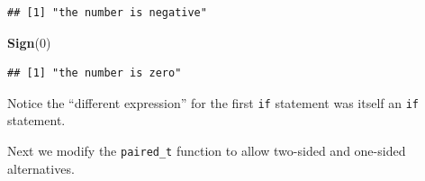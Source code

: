 \documentclass[
]{krantz}
\newenvironment{Shaded}{\begin{snugshade}}{\end{snugshade}}
\newcommand{\DecValTok}[1]{\textcolor[rgb]{0.00,0.00,0.81}{#1}}
\newcommand{\KeywordTok}[1]{\textcolor[rgb]{0.13,0.29,0.53}{\textbf{#1}}}
\newcommand{\NormalTok}[1]{#1}
\begin{document}
\begin{verbatim}
## [1] "the number is negative"
\end{verbatim}

\begin{Shaded}
\begin{Highlighting}[]
\KeywordTok{Sign}\NormalTok{(}\DecValTok{0}\NormalTok{)}
\end{Highlighting}
\end{Shaded}

\begin{verbatim}
## [1] "the number is zero"
\end{verbatim}

Notice the ``different expression'' for the first \texttt{if} statement was itself an \texttt{if} statement.

Next we modify the \texttt{paired\_t} function to allow two-sided and one-sided alternatives.
\end{document}

